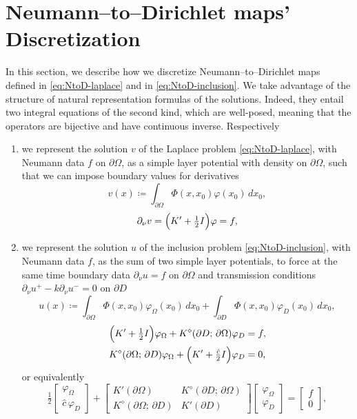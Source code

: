 \documentclass[10pt, a4paper, twoside, openright]{book}
\theoremstyle{definition}
\theoremstyle{plain}
\theoremstyle{plain}
\theoremstyle{plain}
\theoremstyle{plain}
\theoremstyle{plain}
\theoremstyle{plain}
\theoremstyle{plain}
\theoremstyle{plain}
\let\phi\varphi
\begin{document}
\section{Neumann--to--Dirichlet maps' Discretization}
In this section, we describe how we discretize Neumann--to--Dirichlet maps defined in 
\eqref{eq:NtoD-laplace} and in \eqref{eq:NtoD-inclusion}. We take advantage of the 
structure of natural representation formulas of the solutions. Indeed, they entail two 
integral equations of the second kind, which are well-posed, meaning that the 
operators are bijective and have continuous inverse.
Respectively
\begin{enumerate}
 \item we represent the solution $v$ of the Laplace problem \eqref{eq:NtoD-laplace}, with 
 Neumann data $f$ on $\partial \Omega$, as a simple layer potential with density on $\partial \Omega$, such 
 that we can impose boundary values for derivatives
 \begin{equation}
 \label{eq:def-v-representation}
  v(x)\coloneqq \int_{\partial\Omega}\Phi(x,x_0)\phi(x_0)\,dx_0,
 \end{equation}
 \begin{equation}
 \label{eq:2kind-laplace}
  \partial_\nu v=\Bigl(K'+\tfrac{1}{2}I\Bigr)\phi = f,
 \end{equation}
 \item we represent the solution $u$ of the inclusion problem \eqref{eq:NtoD-inclusion}, 
 with Neumann data $f$, as the sum of two simple layer potentials, to force 
 at the same time boundary data $\partial_\nu u = f$ on $\partial \Omega$ and transmission conditions 
 $\partial_\nu u^+-k\partial_\nu u^-=0$ on $\partial D$
 \begin{equation}
 \label{eq:def-u-representation}
  u(x)\coloneqq \int_{\partial\Omega}\Phi(x,x_0)\phi_\Omega(x_0)\,dx_0 + \int_{\partial D}\Phi(x,x_0)\phi_D(x_0)\,dx_0,
 \end{equation}
 \begin{align}
  &\Bigl(K' + \tfrac{1}{2} I\Bigr)\phi_\Omega + K^\diamond(\partial D;\,\partial \Omega)\phi_D = f,\\
  & K^\diamond(\partial \Omega;\,\partial D)\phi_\Omega + \Bigl(K' + \tfrac{\hat{c}}{2} I\Bigr)\phi_D = 0,
 \end{align}
 or equivalently 
 \begin{equation}
 \label{eq:2kind-inclusion}
 \tfrac{1}{2}
 \begin{bmatrix}
  \phi_\Omega\\ \hat{c}\,\phi_D
 \end{bmatrix}
 + 
 \begin{bmatrix}
 K'(\partial \Omega) & K^\diamond(\partial D;\,\partial \Omega)\\
 K^\diamond(\partial \Omega;\,\partial D) & K'(\partial D)
 \end{bmatrix}
 \begin{bmatrix}
  \phi_\Omega\\ \phi_D
 \end{bmatrix}
 =
 \begin{bmatrix}
 f\\ 0
 \end{bmatrix}
 ,
 \end{equation}
\end{enumerate}
\end{document}
